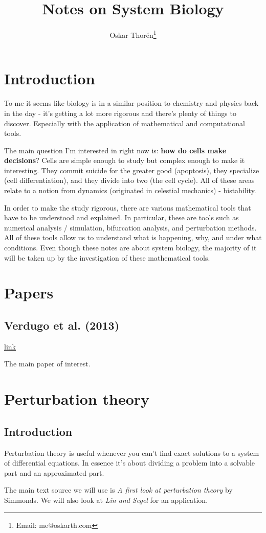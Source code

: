\documentclass[12pt]{report}
\newcommand{\link}[2]{\href{#1}{#2}}
\begin{document}
\title{Notes on System Biology}
\author{Oskar Thor{\'e}n\thanks{Email: me@oskarth.com}}

\maketitle

\chapter{Introduction}

To me it seems like biology is in a similar position to chemistry and
physics back in the day - it's getting a lot more rigorous and there's
plenty of things to discover. Especially with the application of
mathematical and computational tools.

The main question I'm interested in right now is: \textbf{how do cells
  make decisions}? Cells are simple enough to study but complex enough
to make it interesting. They commit suicide for the greater good
(apoptosis), they specialize (cell differentiation), and they divide
into two (the cell cycle). All of these areas relate to a notion from
dynamics (originated in celestial mechanics) - bistability.

In order to make the study rigorous, there are various mathematical
tools that have to be understood and explained. In particular, these
are tools such as numerical analysis / simulation, bifurcation
analysis, and perturbation methods. All of these tools allow us to
understand what is happening, why, and under what conditions. Even
though these notes are about system biology, the majority of it will
be taken up by the investigation of these mathematical tools.

\chapter{Papers}

\section{Verdugo et al. (2013)}

\link{http://rsob.royalsocietypublishing.org/content/royopenbio/3/3/120179.full.pdf}{link}

The main paper of interest.

\chapter{Perturbation theory}

\section{Introduction}

Perturbation theory is useful whenever you can't find exact solutions
to a system of differential equations. In essence it's about dividing
a problem into a solvable part and an approximated part.

The main text source we will use is \textit{A first look at
  perturbation theory} by Simmonds. We will also look at \textit{Lin
  and Segel} for an application.
\end{document}
